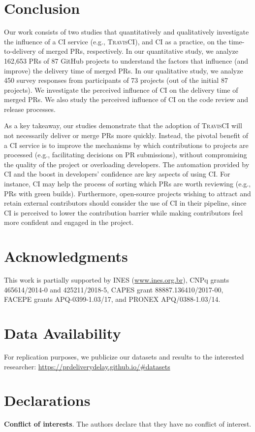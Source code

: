 
\section{Conclusion}
\label{sec_conclusions}

Our work consists of two studies that quantitatively and qualitatively investigate the influence of a CI service (e.g., \textsc{TravisCI}), and CI as a practice, on the time-to-delivery of merged PRs, respectively. In our quantitative study, we analyze 162,653 PRs of 87 GitHub projects to understand the factors that influence (and improve) the delivery time of merged PRs. In our qualitative study, we analyze 450 survey responses from participants of 73 projects (out of the initial 87 projects). We investigate the perceived influence of CI on the delivery time of merged PRs. We also study the perceived influence of CI on the code review and release processes.

As a key takeaway, our studies demonstrate that the adoption of \textsc{TravisCI}
will not necessarily deliver or merge PRs more quickly. Instead, the pivotal benefit of a CI service is to improve the mechanisms by which contributions to projects are processed (e.g., facilitating decisions on PR submissions), without compromising the quality of the project or overloading developers. The automation provided by CI and the boost in developers' confidence are key aspects of using CI. For instance, CI may help the process of sorting which PRs are worth reviewing (e.g., PRs with green builds).
Furthermore, open-source projects wishing to attract and retain external contributors should consider the use of CI in their pipeline, since CI is perceived to lower the contribution barrier while making contributors feel more confident and engaged in the project.

\section*{Acknowledgments}
\label{sec_Acknowledgments}

This work is partially supported by INES (\url{www.ines.org.br}), CNPq grants 465614/2014-0 and 425211/2018-5, CAPES grant 88887.136410/2017-00, FACEPE grants APQ-0399-1.03/17, and PRONEX APQ/0388-1.03/14.

\section*{Data Availability}
For replication purposes, we publicize our datasets and results to the interested researcher: \url{https://prdeliverydelay.github.io/#datasets}

\section*{Declarations}

\textbf{Conflict of interests}. The authors declare that they have no conflict of interest.